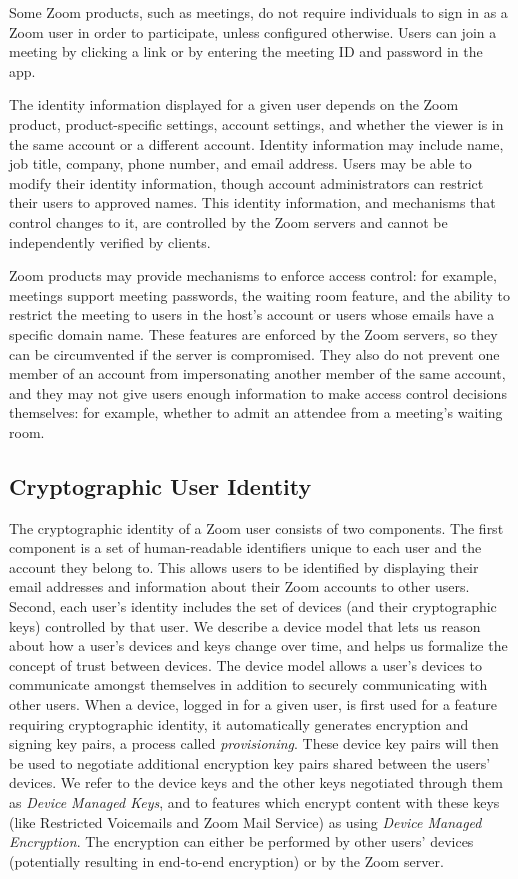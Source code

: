 Some Zoom products, such as meetings, do not require individuals to sign in as a Zoom user in order
to participate, unless configured otherwise. Users can join a meeting by clicking a link or by
entering the meeting ID and password in the app.

The identity information displayed for a given user depends on the Zoom product, product-specific
settings, account settings, and whether the viewer is in the same account or a different account.
Identity information may include name, job title, company, phone number, and email address. Users
may be able to modify their identity information, though account administrators can restrict their
users to approved names. This identity information, and mechanisms that control changes to it, are
controlled by the Zoom servers and cannot be independently verified by clients.



Zoom products may provide mechanisms to enforce access control: for example, meetings support
meeting passwords, the waiting room feature, and the ability to restrict the meeting to users in the
host's account or users whose emails have a specific domain name. These features are enforced by the
Zoom servers, so they can be circumvented if the server is compromised. They also do not prevent one
member of an account from impersonating another member of the same account, and they may not give
users enough information to make access control decisions themselves: for example, whether to admit
an attendee from a meeting's waiting room.

\subsection{Cryptographic User Identity}

The cryptographic identity of a Zoom user consists of two components. The first component is a set
of human-readable identifiers unique to each user and the account they belong to. This allows users
to be identified by displaying their email addresses and information about their Zoom accounts to
other users. Second, each user's identity includes the set of devices (and their cryptographic keys)
controlled by that user. We describe a device model that lets us reason about how a user's devices
and keys change over time, and helps us formalize the concept of trust between devices. The device
model allows a user's devices to communicate amongst themselves in addition to securely
communicating with other users. When a device, logged in for a given user, is first used for a
feature requiring cryptographic identity, it automatically generates encryption and signing key
pairs, a process called \textit{provisioning}. These device key pairs will then be used to negotiate
additional encryption key pairs shared between the users' devices. We refer to the device keys and
the other keys negotiated through them as \emph{Device Managed Keys}, and to features which encrypt
content with these keys (like Restricted Voicemails and Zoom Mail Service) as using \emph{Device
Managed Encryption}. The encryption can either be performed by other users' devices (potentially
resulting in end-to-end encryption) or by the Zoom server.

